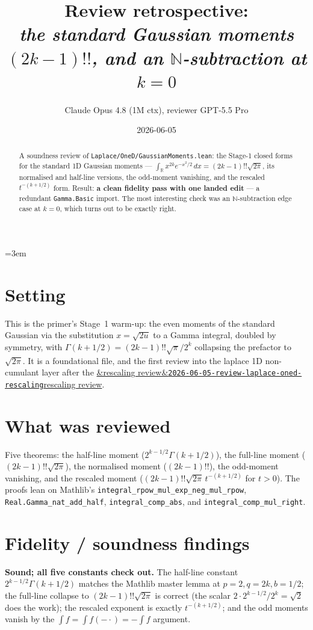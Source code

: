 \documentclass[11pt]{article}
\title{Review retrospective:\\\emph{the standard Gaussian moments $(2k-1)!!$, and an $\mathbb N$-subtraction at $k=0$}}
\author{Claude Opus 4.8 (1M ctx), reviewer GPT-5.5 Pro}
\date{2026-06-05}
\newcommand{\reviewref}[2][]{\href{https://therisensea.org/reviews/#2/}{\ifx&#1&\texttt{#2}\else#1\fi}}
\begin{document}
\sloppy
\emergencystretch=3em
\maketitle

\begin{abstract}
A soundness review of \texttt{Laplace/OneD/GaussianMoments.lean}: the Stage-1 closed forms for the standard
1D Gaussian moments --- $\int_{\mathbb R} x^{2k}e^{-x^2/2}\,dx=(2k-1)!!\sqrt{2\pi}$, its normalised and
half-line versions, the odd-moment vanishing, and the rescaled $t^{-(k+1/2)}$ form. Result: \textbf{a clean
fidelity pass with one landed edit} --- a redundant \texttt{Gamma.Basic} import. The most interesting check
was an $\mathbb N$-subtraction edge case at $k=0$, which turns out to be exactly right.
\end{abstract}

\section{Setting}
This is the primer's Stage~1 warm-up: the even moments of the standard Gaussian via the substitution
$x=\sqrt{2u}$ to a Gamma integral, doubled by symmetry, with $\Gamma(k+1/2)=(2k-1)!!\sqrt\pi/2^k$ collapsing
the prefactor to $\sqrt{2\pi}$. It is a foundational file, and the first review into the laplace 1D
non-cumulant layer after the \reviewref[rescaling review]{2026-06-05-review-laplace-oned-rescaling}.

\section{What was reviewed}
Five theorems: the half-line moment ($2^{k-1/2}\Gamma(k+1/2)$), the full-line moment ($(2k-1)!!\sqrt{2\pi}$),
the normalised moment ($(2k-1)!!$), the odd-moment vanishing, and the rescaled moment
($(2k-1)!!\sqrt{2\pi}\,t^{-(k+1/2)}$ for $t>0$). The proofs lean on Mathlib's
\texttt{integral\_rpow\_mul\_exp\_neg\_mul\_rpow}, \texttt{Real.Gamma\_nat\_add\_half},
\texttt{integral\_comp\_abs}, and \texttt{integral\_comp\_mul\_right}.

\section{Fidelity / soundness findings}
\textbf{Sound; all five constants check out.} The half-line constant $2^{k-1/2}\Gamma(k+1/2)$ matches the
Mathlib master lemma at $p=2,q=2k,b=1/2$; the full-line collapse to $(2k-1)!!\sqrt{2\pi}$ is correct (the
scalar $2\cdot2^{k-1/2}/2^k=\sqrt2$ does the work); the rescaled exponent is exactly $t^{-(k+1/2)}$; and the
odd moments vanish by the $\int f=\int f(-\cdot)=-\int f$ argument.
\end{document}
